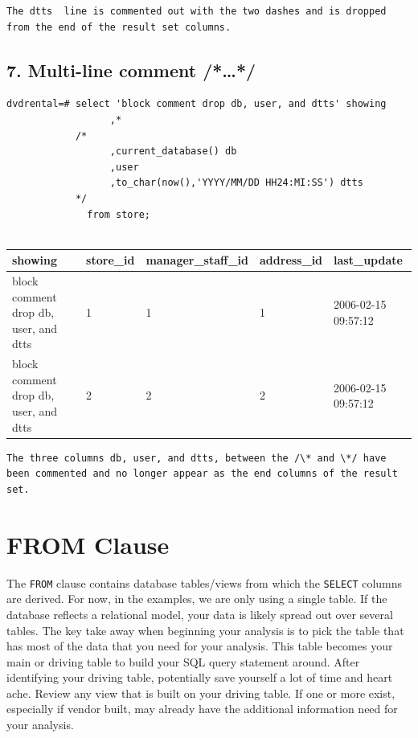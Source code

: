 \documentclass[]{book}
\theoremstyle{definition}
\theoremstyle{definition}
\theoremstyle{definition}
\theoremstyle{remark}
\begin{document}
\begin{verbatim}
The dtts  line is commented out with the two dashes and is dropped from the end of the result set columns.
\end{verbatim}

\hypertarget{multi-line-comment}{%
\subsection{7. Multi-line comment
/*\ldots{}*/}\label{multi-line-comment}}

\begin{verbatim}
dvdrental=# select 'block comment drop db, user, and dtts' showing
                  ,*
            /*
                  ,current_database() db
                  ,user
                  ,to_char(now(),'YYYY/MM/DD HH24:MI:SS') dtts
            */
              from store;
              
\end{verbatim}

\begin{longtable}[]{@{}lllll@{}}
\toprule
showing & store\_id & manager\_staff\_id & address\_id &
last\_update\tabularnewline
\midrule
\endhead
block comment drop db, user, and dtts & 1 & 1 & 1 & 2006-02-15
09:57:12\tabularnewline
block comment drop db, user, and dtts & 2 & 2 & 2 & 2006-02-15
09:57:12\tabularnewline
\bottomrule
\end{longtable}

\begin{verbatim}
The three columns db, user, and dtts, between the /\* and \*/ have been commented and no longer appear as the end columns of the result set.
\end{verbatim}

\hypertarget{from-clause}{%
\section{FROM Clause}\label{from-clause}}

The \texttt{FROM} clause contains database tables/views from which the
\texttt{SELECT} columns are derived. For now, in the examples, we are
only using a single table. If the database reflects a relational model,
your data is likely spread out over several tables. The key take away
when beginning your analysis is to pick the table that has most of the
data that you need for your analysis. This table becomes your main or
driving table to build your SQL query statement around. After
identifying your driving table, potentially save yourself a lot of time
and heart ache. Review any view that is built on your driving table. If
one or more exist, especially if vendor built, may already have the
additional information need for your analysis.
\end{document}
